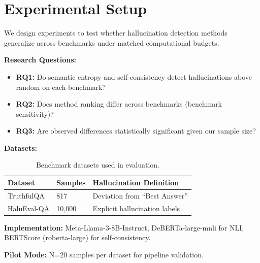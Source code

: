 \section{Experimental Setup}
\label{sec:experiments}

We design experiments to test whether hallucination detection methods generalize across benchmarks under matched computational budgets.

\textbf{Research Questions:}
\begin{itemize}
    \item \textbf{RQ1:} Do semantic entropy and self-consistency detect hallucinations above random on each benchmark?
    \item \textbf{RQ2:} Does method ranking differ across benchmarks (benchmark sensitivity)?
    \item \textbf{RQ3:} Are observed differences statistically significant given our sample size?
\end{itemize}

\textbf{Datasets:}

\begin{table}[h]
\centering
\begin{tabular}{@{}lll@{}}
\toprule
Dataset & Samples & Hallucination Definition \\
\midrule
TruthfulQA & 817 & Deviation from ``Best Answer'' \\
HaluEval-QA & 10,000 & Explicit hallucination labels \\
\bottomrule
\end{tabular}
\caption{Benchmark datasets used in evaluation.}
\label{tab:datasets}
\end{table}

\textbf{Implementation:} Meta-Llama-3-8B-Instruct, DeBERTa-large-mnli for NLI, BERTScore (roberta-large) for self-consistency.

\textbf{Pilot Mode:} N=20 samples per dataset for pipeline validation.
